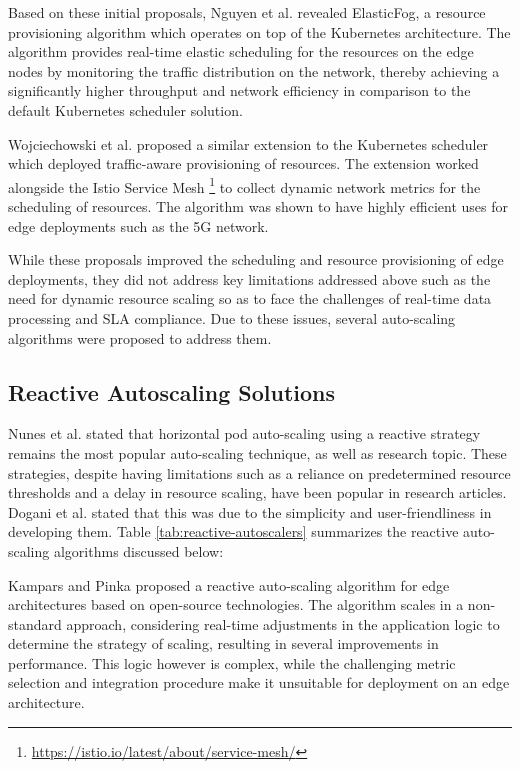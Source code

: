 Based on these initial proposals, Nguyen et al. \cite{nguyen2020elasticfog} revealed ElasticFog, a resource provisioning algorithm which operates on top of the Kubernetes architecture. The algorithm provides real-time elastic scheduling for the resources on the edge nodes by monitoring the traffic distribution on the network, thereby achieving a significantly higher throughput and network efficiency in comparison to the default Kubernetes scheduler solution.\par

Wojciechowski et al. \cite{wojciechowski2021netmarks} proposed a similar extension to the Kubernetes scheduler which deployed traffic-aware provisioning of resources. The extension worked alongside the Istio Service Mesh \footnote{\url{https://istio.io/latest/about/service-mesh/}} to collect dynamic network metrics for the scheduling of resources. The algorithm was shown to have highly efficient uses for edge deployments such as the 5G network.\par

While these proposals improved the scheduling and resource provisioning of edge deployments, they did not address key limitations addressed above such as the need for dynamic resource scaling so as to face the challenges of real-time data processing and SLA compliance. Due to these issues, several auto-scaling algorithms were proposed to address them.

\subsection{Reactive Autoscaling Solutions}
\label{subsec:reactive-solutions}

Nunes et al. \cite{nunes2021state} stated that horizontal pod auto-scaling using a reactive strategy remains the most popular auto-scaling technique, as well as research topic. These strategies, despite having limitations such as a reliance on predetermined resource thresholds and a delay in resource scaling, have been popular in research articles.  Dogani et al. \cite{dogani2023auto} stated that this was due to the simplicity and user-friendliness in developing them. Table \ref{tab:reactive-autoscalers} summarizes the reactive auto-scaling algorithms discussed below:\par

Kampars and Pinka \cite{kampars2017auto} proposed a reactive auto-scaling algorithm for edge architectures based on open-source technologies. The algorithm scales in a non-standard approach, considering real-time adjustments in the application logic to determine the strategy of scaling, resulting in several improvements in performance. This logic however is complex, while the challenging metric selection and integration procedure make it unsuitable for deployment on an edge architecture.\par

